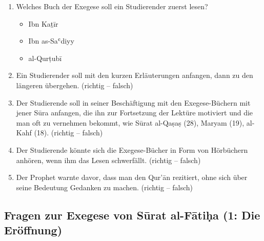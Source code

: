 \begin{enumerate}[leftmargin=1.6em]
  und einer Mitte einteilen. (richtig -- falsch)
\item Welches Buch der Exegese soll ein Studierender zuerst lesen?
  \begin{itemize}
    \item Ibn Kaṯīr
    \item Ibn as-Saʿdiyy
    \item al-Qurṭubī
  \end{itemize}
\item Ein Studierender soll mit den kurzen Erläuterungen anfangen, dann zu den längeren
  übergehen. (richtig -- falsch)
\item Der Studierende soll in seiner Beschäftigung mit den Exegese-Büchern mit jener Sūra
  anfangen, die ihn zur Fortsetzung der Lektüre motiviert und die man oft zu vernehmen bekommt,
  wie Sūrat al-Qaṣaṣ (28), Maryam (19), al-Kahf (18). (richtig -- falsch)
\item Der Studierende könnte sich die Exegese-Bücher in Form von Hörbüchern anhören, wenn
  ihm das Lesen schwerfällt. (richtig -- falsch)
\item Der Prophet  warnte davor, dass man den Qur’ān rezitiert, ohne sich über seine
  Bedeutung Gedanken zu machen. (richtig -- falsch)
\end{enumerate}

\subsection*{Fragen zur Exegese von Sūrat al-Fātiḥa (1: Die Eröffnung)}

